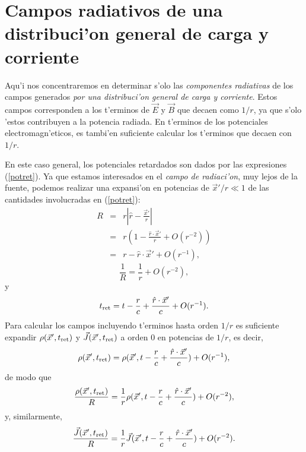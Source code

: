 \section{Campos radiativos de una distribuci'on general de carga y corriente}

Aqu'i nos concentraremos en determinar s'olo las \textit{componentes radiativas} de los campos generados \textit{por una distribuci'on general de carga y corriente}. Estos campos corresponden a los t'erminos de $\vec{E}$ y $\vec{B}$ que decaen como $1/r$, ya que s'olo 'estos contribuyen a la potencia radiada. En t'erminos de los potenciales electromagn'eticos, es tambi'en suficiente calcular los t'erminos que decaen con $1/r$.

En este caso general, los potenciales retardados son dados por las expresiones (\ref{potret}). Ya que estamos interesados en el \textit{campo de radiaci'on}, muy lejos de la fuente, podemos realizar una expansi'on en potencias de $\vec{x}'/r\ll 1$ de las cantidades involucradas en (\ref{potret}):
\begin{eqnarray}
 R&=&r\left|\hat{r}-\frac{\vec{x}'}{r}\right| \\
&=&r\left(1-\frac{\hat{r}\cdot\vec{x}'}{r}+O(r^{-2})\right) \\
&=& r-\hat{r}\cdot\vec{x}'+O(r^{-1}),
\end{eqnarray}
\begin{equation}
 \frac{1}{R}=\frac{1}{r}+O(r^{-2}),
\end{equation}
y
\begin{equation}
 t_{\rm ret}=t-\frac{r}{c}+\frac{\hat{r}\cdot\vec{x}'}{c}+O(r^{-1}).
\end{equation}
Para calcular los campos incluyendo t'erminos hasta orden $1/r$ es suficiente expandir $\rho(\vec{x}',t_{\rm ret})$ y $\vec{J}(\vec{x}',t_{\rm ret})$ a orden 0 en potencias de $1/r$, es decir,
\begin{equation}
 \rho(\vec{x}',t_{\rm ret})=\rho(\vec{x}',t-\frac{r}{c}+\frac{\hat{r}\cdot\vec{x}'}{c})+O(r^{-1}),
\end{equation}
de modo que
\begin{equation}
 \frac{\rho(\vec{x}',t_{\rm ret})}{R}=\frac{1}{r}\rho(\vec{x}',t-\frac{r}{c}+\frac{\hat{r}\cdot\vec{x}'}{c})+O(r^{-2}),
\end{equation}
y, similarmente,
\begin{equation}
 \frac{\vec{J}(\vec{x}',t_{\rm ret})}{R}=\frac{1}{r}\vec{J}(\vec{x}',t-\frac{r}{c}+\frac{\hat{r}\cdot\vec{x}'}{c})+O(r^{-2}).
\end{equation}
